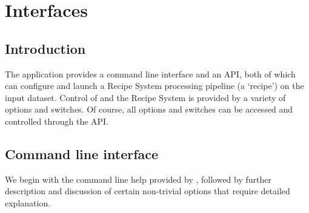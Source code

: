 \documentclass[letterpaper,10pt,english]{sphinxmanual}
\begin{document}
\chapter{Interfaces}
\label{interfaces:interfaces}\label{interfaces::doc}

\section{Introduction}
\label{interfaces:introduction}
The  application provides a command line interface and an API, both
of which can configure and launch a Recipe System processing pipeline (a `recipe')
on the input dataset. Control of  and the Recipe System is provided
by a variety of options and switches. Of course, all options and switches
can be accessed and controlled through the API.


\section{Command line interface}
\label{interfaces:command-line-interface}
We begin with the command line help provided by , followed by
further description and discussion of certain non-trivial options that require
detailed explanation.
\end{document}
